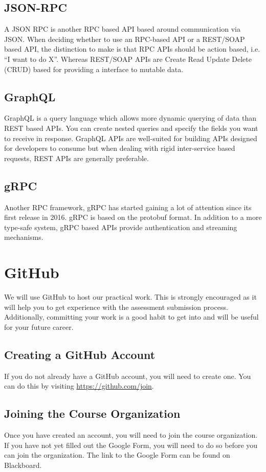 \documentclass{csse4400}
\begin{document}
\subsection{JSON-RPC}
A JSON RPC is another RPC based API based around communication via JSON.
When deciding whether to use an RPC-based API or a REST/SOAP based API,
the distinction to make is that RPC APIs should be action based, i.e. ``I want to do X''.
Whereas REST/SOAP APIs are Create Read Update Delete (CRUD) based for providing a interface to mutable data.

\subsection{GraphQL}
GraphQL is a query language which allows more dynamic querying of data than REST based APIs.
You can create nested queries and specify the fields you want to receive in response.
GraphQL APIs are well-suited for building APIs designed for developers to consume but when dealing with rigid inter-service based requests,
REST APIs are generally preferable.

\subsection{gRPC}
Another RPC framework, gRPC has started gaining a lot of attention since its first release in 2016.
gRPC is based on the protobuf format.
In addition to a more type-safe system,
gRPC based APIs provide authentication and streaming mechanisms.

\section{GitHub}

We will use GitHub to host our practical work.
This is strongly encouraged as it will help you to get experience with the assessment submission process.
Additionally, committing your work is a good habit to get into and will be useful for your future career.

\subsection{Creating a GitHub Account}
If you do not already have a GitHub account, you will need to create one.
You can do this by visiting \url{https://github.com/join}.

\subsection{Joining the Course Organization}
Once you have created an account, you will need to join the course organization.
If you have not yet filled out the Google Form,
you will need to do so before you can join the organization.
The link to the Google Form can be found on Blackboard.
\end{document}
